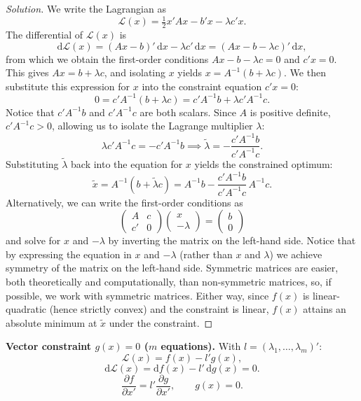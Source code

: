 \documentclass[14pt]{extarticle}
\theoremstyle{plain}
\theoremstyle{definition}
\theoremstyle{remark}
\newenvironment{solution}{%
  \begin{proof}[Solution]%
}{%
  \end{proof}%
}
\newcommand{\dd}{\mathrm{d}}
\begin{document}
\begin{solution}
We write the Lagrangian as
\[
\mathcal{L}(x) = \tfrac{1}{2} x'Ax - b'x - \lambda c'x.
\]
The differential of $\mathcal{L}(x)$ is
\[
\dd\mathcal{L}(x) = (Ax - b)'\, \dd x - \lambda c'\, \dd x = (Ax - b - \lambda c)'\, \dd x,
\]
from which we obtain the first-order conditions $Ax - b - \lambda c = 0$ and $c'x = 0$.
This gives $Ax = b + \lambda c$, and isolating $x$ yields $x = A^{-1}(b + \lambda c)$.
We then substitute this expression for $x$ into the constraint equation $c'x = 0$:
\[
0 = c'A^{-1}(b + \lambda c) = c'A^{-1}b + \lambda c'A^{-1}c.
\]
Notice that $c'A^{-1}b$ and $c'A^{-1}c$ are both scalars. Since $A$ is positive definite, $c'A^{-1}c > 0$, allowing us to isolate the Lagrange multiplier $\lambda$:
\[
\lambda c'A^{-1}c = -c'A^{-1}b \implies \tilde{\lambda} = -\frac{c'A^{-1}b}{c'A^{-1}c}.
\]
Substituting $\tilde{\lambda}$ back into the equation for $x$ yields the constrained optimum:
\[
\tilde{x} = A^{-1}(b + \tilde{\lambda} c) = A^{-1}b - \frac{c'A^{-1}b}{c'A^{-1}c}\, A^{-1}c.
\]
Alternatively, we can write the first-order conditions as
\[
\begin{pmatrix} A & c \\ c' & 0 \end{pmatrix}
\begin{pmatrix} x \\ -\lambda \end{pmatrix}
= \begin{pmatrix} b \\ 0 \end{pmatrix}
\]
and solve for $x$ and $-\lambda$ by inverting the matrix on the left-hand side. Notice that by expressing the equation in $x$ and $-\lambda$ (rather than $x$ and $\lambda$) we achieve symmetry of the matrix on the left-hand side. Symmetric matrices are easier, both theoretically and computationally, than non-symmetric matrices, so, if possible, we work with symmetric matrices.
Either way, since $f(x)$ is linear-quadratic (hence strictly convex) and the constraint is linear, $f(x)$ attains an absolute minimum at $\tilde{x}$ under the constraint.
\end{solution}

\textbf{Vector constraint $g(x) = 0$ ($m$ equations).} With $l = (\lambda_1, \dots, \lambda_m)'$:
\begin{equation}\label{eq:23}
\mathcal{L}(x) = f(x) - l' g(x),
\end{equation}
\begin{equation}\label{eq:24}
\dd\mathcal{L}(x) = \dd f(x) - l'\, \dd g(x) = 0.
\end{equation}
\begin{equation}\label{eq:25}
\frac{\partial f}{\partial x'} = l' \frac{\partial g}{\partial x'}, \qquad g(x) = 0.
\end{equation}
\end{document}

